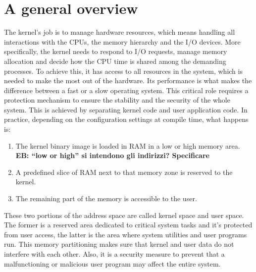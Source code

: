 \documentclass[10pt]{book}
\newcommand{\mycomment}[1]{\textbf{#1}}  %
\begin{document}
\section{A general overview} 
\label{sec:general}
The kernel's job is to manage hardware resources, which means handling all interactions with the CPUs, the memory hierarchy and the I/O devices. More specifically, the kernel needs to respond to I/O requests, manage memory allocation and decide how the CPU time is shared among the demanding processes. To achieve this, it has access to all resources in the system, which is needed to make the most out of the hardware. Its performance is what makes the difference between a fast or a slow operating system. This critical role requires a protection mechanism to ensure the stability and the security of the whole system. This is achieved by separating kernel code and user application code. In practice, depending on the configuration settings at compile time, what happens is: 
\begin{enumerate}
    \item The kernel binary image is loaded in RAM in a low or high memory area. \mycomment{EB: ``low or high'' si intendono gli indirizzi? Specificare}
    \item A predefined slice of RAM next to that memory zone is reserved to the kernel. 
    \item The remaining part of the memory is accessible to the user.
\end{enumerate}
These two portions of the address space %
are called kernel space and user space. The former is a reserved area dedicated to critical system tasks and it's protected from user access, the latter is the area where system utilities and user programs run. This memory partitioning makes sure that kernel and user data do not interfere with each other. Also, it is a security measure to prevent that a malfunctioning or malicious user program may affect the entire system.
\end{document}

